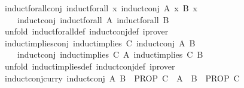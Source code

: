 \begin{isabellebody}
\isanewline
{}\isamarkupfalse%
\ induct{\isacharunderscore}{\kern0pt}forall{\isacharunderscore}{\kern0pt}conj{\isacharcolon}{\kern0pt}\ {\isachardoublequoteopen}induct{\isacharunderscore}{\kern0pt}forall\ {\isacharparenleft}{\kern0pt}{\isasymlambda}x{\isachardot}{\kern0pt}\ induct{\isacharunderscore}{\kern0pt}conj\ {\isacharparenleft}{\kern0pt}A\ x{\isacharparenright}{\kern0pt}\ {\isacharparenleft}{\kern0pt}B\ x{\isacharparenright}{\kern0pt}{\isacharparenright}{\kern0pt}\ {\isacharequal}{\kern0pt}\isanewline
\ \ \ \ induct{\isacharunderscore}{\kern0pt}conj\ {\isacharparenleft}{\kern0pt}induct{\isacharunderscore}{\kern0pt}forall\ A{\isacharparenright}{\kern0pt}\ {\isacharparenleft}{\kern0pt}induct{\isacharunderscore}{\kern0pt}forall\ B{\isacharparenright}{\kern0pt}{\isachardoublequoteclose}\isanewline
%
\isadelimproof
\ \ %
\endisadelimproof
%
\isatagproof
{}\isamarkupfalse%
\ {\isacharparenleft}{\kern0pt}unfold\ induct{\isacharunderscore}{\kern0pt}forall{\isacharunderscore}{\kern0pt}def\ induct{\isacharunderscore}{\kern0pt}conj{\isacharunderscore}{\kern0pt}def{\isacharparenright}{\kern0pt}\ iprover%
\endisatagproof
{\isafoldproof}%
%
\isadelimproof
\isanewline
%
\endisadelimproof
\isanewline
{}\isamarkupfalse%
\ induct{\isacharunderscore}{\kern0pt}implies{\isacharunderscore}{\kern0pt}conj{\isacharcolon}{\kern0pt}\ {\isachardoublequoteopen}induct{\isacharunderscore}{\kern0pt}implies\ C\ {\isacharparenleft}{\kern0pt}induct{\isacharunderscore}{\kern0pt}conj\ A\ B{\isacharparenright}{\kern0pt}\ {\isacharequal}{\kern0pt}\isanewline
\ \ \ \ induct{\isacharunderscore}{\kern0pt}conj\ {\isacharparenleft}{\kern0pt}induct{\isacharunderscore}{\kern0pt}implies\ C\ A{\isacharparenright}{\kern0pt}\ {\isacharparenleft}{\kern0pt}induct{\isacharunderscore}{\kern0pt}implies\ C\ B{\isacharparenright}{\kern0pt}{\isachardoublequoteclose}\isanewline
%
\isadelimproof
\ \ %
\endisadelimproof
%
\isatagproof
{}\isamarkupfalse%
\ {\isacharparenleft}{\kern0pt}unfold\ induct{\isacharunderscore}{\kern0pt}implies{\isacharunderscore}{\kern0pt}def\ induct{\isacharunderscore}{\kern0pt}conj{\isacharunderscore}{\kern0pt}def{\isacharparenright}{\kern0pt}\ iprover%
\endisatagproof
{\isafoldproof}%
%
\isadelimproof
\isanewline
%
\endisadelimproof
\isanewline
{}\isamarkupfalse%
\ induct{\isacharunderscore}{\kern0pt}conj{\isacharunderscore}{\kern0pt}curry{\isacharcolon}{\kern0pt}\ {\isachardoublequoteopen}{\isacharparenleft}{\kern0pt}induct{\isacharunderscore}{\kern0pt}conj\ A\ B\ {\isasymLongrightarrow}\ PROP\ C{\isacharparenright}{\kern0pt}\ {\isasymequiv}\ {\isacharparenleft}{\kern0pt}A\ {\isasymLongrightarrow}\ B\ {\isasymLongrightarrow}\ PROP\ C{\isacharparenright}{\kern0pt}{\isachardoublequoteclose}\isanewline

\end{isabellebody}
